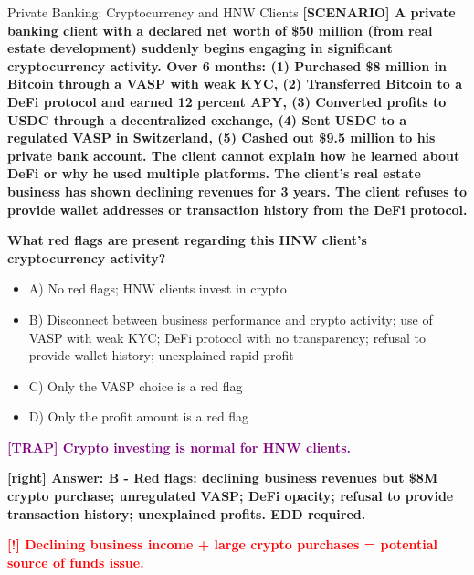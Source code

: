 \documentclass[11pt,a4paper]{beamer}
\newcommand{\redflag}[1]{\textcolor{red}{\textbf{[!] #1}}}
\newcommand{\trap}[1]{\textcolor{purple}{\textbf{[TRAP] #1}}}
\newcommand{\correct}[1]{\textcolor{green!50!black}{\textbf{[right] #1}}}
\newcommand{\scenario}[1]{\textcolor{blue!70!black}{\textbf{[SCENARIO] #1}}}
\begin{document}
	
	\begin{frame}{Private Banking: Cryptocurrency and HNW Clients}
		\tiny
		\scenario{A private banking client with a declared net worth of \$50 million (from real estate development) suddenly begins engaging in significant cryptocurrency activity. Over 6 months: (1) Purchased \$8 million in Bitcoin through a VASP with weak KYC, (2) Transferred Bitcoin to a DeFi protocol and earned 12 percent APY, (3) Converted profits to USDC through a decentralized exchange, (4) Sent USDC to a regulated VASP in Switzerland, (5) Cashed out \$9.5 million to his private bank account. The client cannot explain how he learned about DeFi or why he used multiple platforms. The client's real estate business has shown declining revenues for 3 years. The client refuses to provide wallet addresses or transaction history from the DeFi protocol.}
		
		\vspace{0.02cm}
		\textbf{What red flags are present regarding this HNW client's cryptocurrency activity?}
		\vspace{0.02cm}
		
		\begin{itemize}
			\item A) No red flags; HNW clients invest in crypto
			\item B) Disconnect between business performance and crypto activity; use of VASP with weak KYC; DeFi protocol with no transparency; refusal to provide wallet history; unexplained rapid profit
			\item C) Only the VASP choice is a red flag
			\item D) Only the profit amount is a red flag
		\end{itemize}
		
		\vspace{0.02cm}
		\trap{Crypto investing is normal for HNW clients.}
		
		\vspace{0.02cm}
		\correct{Answer: B - Red flags: declining business revenues but \$8M crypto purchase; unregulated VASP; DeFi opacity; refusal to provide transaction history; unexplained profits. EDD required.}
		
		\vspace{0.02cm}
		\redflag{Declining business income + large crypto purchases = potential source of funds issue.}
	\end{frame}
	
\end{document}
